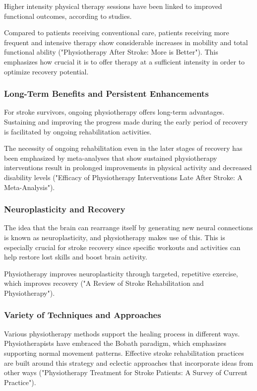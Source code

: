 Higher intensity physical therapy sessions have been linked to improved functional outcomes, according to studies. 


Compared to patients receiving conventional care, patients receiving more frequent and intensive therapy show considerable increases in mobility and total functional ability ("Physiotherapy After Stroke: More is Better"). 
This emphasizes how crucial it is to offer therapy at a sufficient intensity in order to optimize recovery potential.

\subsubsection{Long-Term Benefits and Persistent Enhancements}
\label{sec:long-termbenefitsandpersistentenhancements}
For stroke survivors, ongoing physiotherapy offers long-term advantages. Sustaining and improving the progress made during the early period of recovery is facilitated by ongoing rehabilitation activities. 


The necessity of ongoing rehabilitation even in the later stages of recovery has been emphasized by meta-analyses that show sustained physiotherapy interventions result in prolonged improvements in physical activity and decreased disability levels ("Efficacy of Physiotherapy Interventions Late After Stroke: A Meta-Analysis"). 

\subsubsection{Neuroplasticity and Recovery}
\label{sec:neuroplasticityandrecovery}
The idea that the brain can rearrange itself by generating new neural connections is known as neuroplasticity, and physiotherapy makes use of this. This is especially crucial for stroke recovery since specific workouts and activities can help restore lost skills and boost brain activity. 


Physiotherapy improves neuroplasticity through targeted, repetitive exercise, which improves recovery ("A Review of Stroke Rehabilitation and Physiotherapy").

\subsubsection{Variety of Techniques and Approaches}
\label{sec:varietyoftechniquesandapproaches}
Various physiotherapy methods support the healing process in different ways. Physiotherapists have embraced the Bobath paradigm, which emphasizes supporting normal movement patterns. Effective stroke rehabilitation practices are built around this strategy and eclectic approaches that incorporate ideas from other ways ("Physiotherapy Treatment for Stroke Patients: A Survey of Current Practice"). 


